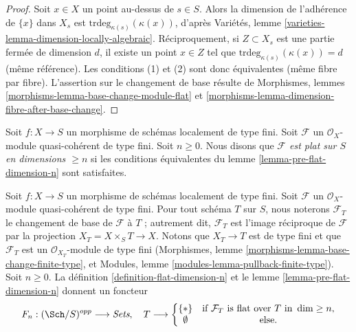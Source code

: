 \begin{proof}
Soit $x \in X$ un point au-dessus de $s \in S$.
Alors la dimension de l'adhérence de $\{x\}$ dans $X_s$
est $\text{trdeg}_{\kappa(s)}(\kappa(x))$, d'après
Variétés, lemme \ref{varieties-lemma-dimension-locally-algebraic}.
Réciproquement, si $Z \subset X_s$ est une partie fermée
de dimension $d$, il existe un point $x \in Z$
tel que $\text{trdeg}_{\kappa(s)}(\kappa(x)) = d$ (même référence).
Les conditions (1) et (2) sont donc équivalentes (même fibre par fibre).
L'assertion sur le changement de base résulte de
Morphismes, lemmes \ref{morphisms-lemma-base-change-module-flat} et
\ref{morphisms-lemma-dimension-fibre-after-base-change}.
\end{proof}

\begin{definition}
\label{definition-flat-dimension-n}
Soit $f : X \to S$ un morphisme de schémas localement de type fini.
Soit $\mathcal{F}$ un $\mathcal{O}_X$-module quasi-cohérent de type fini.
Soit $n \geq 0$.
Nous disons que {\it $\mathcal{F}$ est plat sur $S$ en dimensions $\geq n$}
si les conditions équivalentes du lemme \ref{lemma-pre-flat-dimension-n}
sont satisfaites.
\end{definition}

\begin{situation}
\label{situation-flat-dimension-n}
Soit $f : X \to S$ un morphisme de schémas localement de type fini.
Soit $\mathcal{F}$ un $\mathcal{O}_X$-module quasi-cohérent de type
fini. Pour tout schéma $T$ sur $S$, nous noterons $\mathcal{F}_T$ le
changement de base de $\mathcal{F}$ à $T$ ; autrement dit, $\mathcal{F}_T$
est l'image réciproque de $\mathcal{F}$ par la projection
$X_T = X \times_S T \to X$. Notons que $X_T \to T$ est de type fini
et que $\mathcal{F}_T$ est un $\mathcal{O}_{X_T}$-module
de type fini (Morphismes, lemme
\ref{morphisms-lemma-base-change-finite-type}, et
Modules, lemme \ref{modules-lemma-pullback-finite-type}).
Soit $n \geq 0$. La définition \ref{definition-flat-dimension-n} et le
lemme \ref{lemma-pre-flat-dimension-n} donnent un foncteur
\begin{equation}
\label{equation-flat-dimension-n}
F_n : (\Sch/S)^{opp} \longrightarrow \textit{Sets}, \quad
T \longrightarrow \left\{
\begin{matrix}
\{*\} & \text{if }\mathcal{F}_T\text{ is flat over }T\text{ in }\dim \geq n, \\
\emptyset & \text{else.}
\end{matrix}
\right.
\end{equation}
\end{situation}

